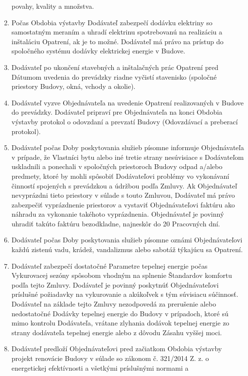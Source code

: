 \begin{multicols}{2}
\begin{enumerate}
  povahy, kvality a množstva.
\item
  Počas Obdobia výstavby Dodávateľ zabezpečí dodávku elektriny so
  samostatným meraním a uhradí elektrinu spotrebovanú na realizáciu a
  inštaláciu Opatrení, ak je to možné. Dodávateľ má právo na prístup do
  spoločného systému dodávky elektrickej energie v Budove.
\item
  Dodávateľ po ukončení stavebných a inštalačných prác Opatrení pred
  Dátumom uvedenia do prevádzky riadne vyčistí stavenisko (spoločné
  priestory Budovy, okná, vchody a okolie).
\item
  Dodávateľ vyzve Objednávateľa na uvedenie Opatrení realizovaných v
  Budove do prevádzky. Dodávateľ pripraví pre Objednávateľa na konci
  Obdobia výstavby protokol o odovzdaní a prevzatí Budovy (Odovzdávací a
  preberací protokol).
\item
  Dodávateľ počas Doby poskytovania služieb písomne informuje
  Objednávateľa v prípade, že Vlastníci bytu alebo iné tretie strany
  nesúvisiace s Dodávateľom uskladnili a ponechali v spoločných
  priestoroch Budovy odpad a/alebo predmety, ktoré by mohli spôsobiť
  Dodávateľovi problémy vo vykonávaní činností spojených s prevádzkou a
  údržbou podľa Zmluvy. Ak Objednávateľ nevyprázdni tieto priestory v
  súlade s touto Zmluvou, Dodávateľ má právo zabezpečiť vyprázdnenie
  priestorov a vystaviť Objednávateľovi faktúru ako náhradu za vykonanie
  takéhoto vyprázdnenia. Objednávateľ je povinný uhradiť takúto faktúru
  bezodkladne, najneskôr do 20 Pracovných dní.
\item
  Dodávateľ počas Doby poskytovania služieb písomne oznámi
  Objednávateľovi každú zistenú vadu, krádež, vandalizmus alebo sabotáž
  týkajúcu sa Opatrení.
\item
  Dodávateľ zabezpečí dostatočné Parametre tepelnej energie počas
  Vykurovacej sezóny spôsobom vhodným na splnenie Štandardov komfortu
  podľa tejto Zmluvy. Dodávateľ je povinný poskytnúť Objednávateľovi
  príslušné požiadavky na vykurovanie a akúkoľvek s tým súvisiacu
  súčinnosť. Dodávateľ na základe tejto Zmluvy nezodpovedá za prerušenie
  alebo nedostatočné Dodávky tepelnej energie do Budovy v prípadoch,
  ktoré sú mimo kontrolu Dodávateľa, vrátane zlyhania dodávok tepelnej
  energie zo strany dodávateľa tepelnej energie alebo z dôvodu Zásahu
  vyššej moci.
\item
  Dodávateľ predloží Objednávateľovi pred začiatkom Obdobia výstavby
  projekt renovácie Budovy v súlade so zákonom č. 321/2014 Z. z. o
  energetickej efektívnosti a všetkými príslušnými normami a

\end{enumerate}
\end{multicols}
